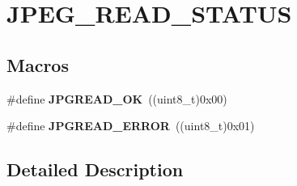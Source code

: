 \hypertarget{group___j_p_e_g___r_e_a_d___s_t_a_t_u_s}{}\section{J\+P\+E\+G\+\_\+\+R\+E\+A\+D\+\_\+\+S\+T\+A\+T\+US}
\label{group___j_p_e_g___r_e_a_d___s_t_a_t_u_s}
\subsection*{Macros}
\begin{DoxyCompactItemize}
\item 
\mbox{\label{group___j_p_e_g___r_e_a_d___s_t_a_t_u_s_ga8b0ad69cafc7f5c4112b69774aa13d44}} 
\#define {\bfseries J\+P\+G\+R\+E\+A\+D\+\_\+\+OK}~((uint8\+\_\+t)0x00)
\item 
\mbox{\label{group___j_p_e_g___r_e_a_d___s_t_a_t_u_s_ga51deab3db1def45fdc0379a3174553b3}} 
\#define {\bfseries J\+P\+G\+R\+E\+A\+D\+\_\+\+E\+R\+R\+OR}~((uint8\+\_\+t)0x01)
\end{DoxyCompactItemize}


\subsection{Detailed Description}
